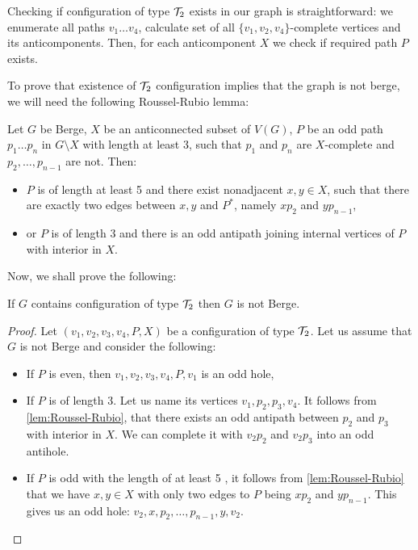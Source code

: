 \documentclass{article}
\begin{document}
Checking if configuration of type $\mathcal{T}_2$ exists in our graph is straightforward: we enumerate all paths $v_1\ldots v_4$, calculate set of all $\{v_1, v_2, v_4\}$-complete vertices and its anticomponents. Then, for each anticomponent $X$ we check if required path $P$ exists.

To prove that existence of $\mathcal{T}_2$ configuration implies that the graph is not berge, we will need the following Roussel-Rubio lemma:

\begin{lemma}\label{lem:Roussel-Rubio}
	Let $G$ be Berge, $X$ be an anticonnected subset of $V(G)$, $P$ be an odd path $p_1\ldots p_n$ in $G\setminus X$ with length at least 3, such that $p_1$ and $p_n$ are $X$-complete and $p_2, \ldots, p_{n-1}$ are not. Then:
	\begin{itemize}
		\item $P$ is of length at least 5 and there exist nonadjacent $x, y \in X$, such that there are exactly two edges between $x, y$ and $P^*$, namely $xp_2$ and $yp_{n-1}$,
		\item or $P$ is of length 3 and there is an odd antipath joining internal vertices of $P$ with interior in $X$.
	\end{itemize}
\end{lemma}

Now, we shall prove the following:

\begin{lemma}
	If $G$ contains configuration of type $\mathcal{T}_2$ then $G$ is not Berge.
\end{lemma}
\begin{proof}
	Let $(v_1, v_2, v_3, v_4, P, X)$ be a configuration of type $\mathcal{T}_2$. Let us assume that $G$ is not Berge and consider the following:
	\begin{itemize}
		\item If $P$ is even, then $v_1, v_2, v_3, v_4, P, v_1$ is an odd hole,
		\item If $P$ is of length 3.  Let us name its vertices $v_1, p_2, p_3, v_4$. It follows from \cref{lem:Roussel-Rubio}, that there exists an odd antipath between $p_2$ and $p_3$ with interior in $X$. We can complete it with $v_2p_2$ and $v_2p_3$ into an odd antihole.
		\item If $P$ is odd with the length of at least 5 , it follows from \cref{lem:Roussel-Rubio} that we have $x, y \in X$ with only two edges to $P$ being $xp_2$ and $yp_{n-1}$. This gives us an odd hole: $v_2, x, p_2, \ldots, p_{n-1}, y, v_2$.
	\end{itemize}
\end{proof}
\end{document}
